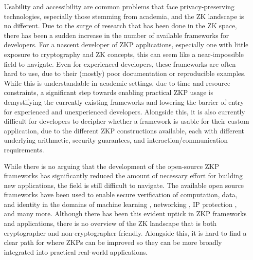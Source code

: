 Usability and accessibility are common problems that face privacy-preserving technologies, especially those stemming from academia, and the ZK landscape is no different. Due to the surge of research that has been done in the ZK space, there has been a sudden increase in the number of available frameworks for developers. For a nascent developer of ZKP applications, especially one with little exposure to cryptography and ZK concepts, this can seem like a near-impossible field to navigate. Even for experienced developers, these frameworks are often hard to use, due to their (mostly) poor documentation or reproducible examples. While this is understandable in academic settings, due to time and resource constraints, a significant step towards enabling practical ZKP usage is demystifying the currently existing frameworks and lowering the barrier of entry for experienced and unexperienced developers. Alongside this, it is also currently difficult for developers to decipher whether a framework is usable for their custom application, due to the different ZKP constructions available, each with different underlying arithmetic, security guarantees, and interaction/communication requirements. 

While there is no arguing that the development of the open-source ZKP frameworks has significantly reduced the amount of necessary effort for building new applications, the field is still difficult to navigate. The available open source frameworks have been used to enable secure verification of computation, data, and identity in the domains of machine learning \cite{zhang2020zero}, networking \cite{grubbs2022zero}, IP protection \cite{sheybani2023zkrownn}, and many more. Although there has been this evident uptick in ZKP frameworks and applications, there is no overview of the ZK landscape that is both cryptographer and non-cryptographer friendly. Alongside this, it is hard to find a clear path for where ZKPs can be improved so they can be more broadly integrated into practical real-world applications. 


